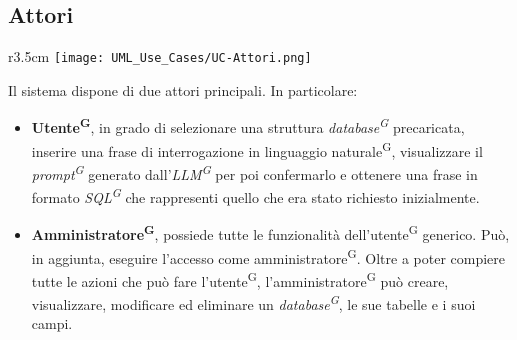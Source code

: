 \subsection{Attori}
\begin{wrapfigure}{r}{3.5cm}
	\texttt{[image: UML\_Use\_Cases/UC-Attori.png]}
\end{wrapfigure}
Il sistema dispone di due attori principali. In particolare:
\begin{itemize}
	\item \textbf{Utente\textsuperscript{G}}, in grado di selezionare una struttura \textit{database\textsuperscript{G}} precaricata, inserire una frase di interrogazione in linguaggio naturale\textsuperscript{G}, visualizzare il \textit{prompt\textsuperscript{G}} generato dall'\textit{LLM\textsuperscript{G}} per poi confermarlo e ottenere una frase in formato \textit{SQL\textsuperscript{G}} che rappresenti quello che era stato richiesto inizialmente.

	\item \textbf{Amministratore\textsuperscript{G}}, possiede tutte le funzionalità dell'utente\textsuperscript{G} generico. Può, in aggiunta, eseguire l'accesso come amministratore\textsuperscript{G}. Oltre a poter compiere tutte le azioni che può fare l'utente\textsuperscript{G}, l'amministratore\textsuperscript{G} può creare, visualizzare, modificare ed eliminare un \textit{database\textsuperscript{G}}, le sue tabelle e i suoi campi.
\end{itemize}

\setcounter{secnumdepth}{0}

